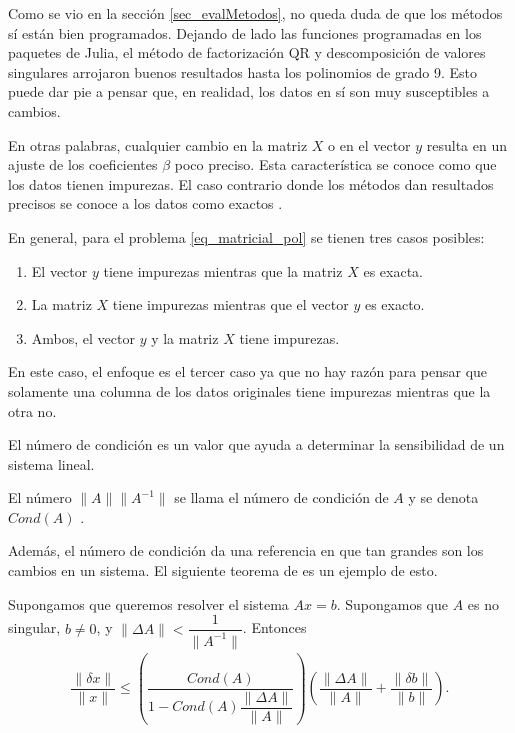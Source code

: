 Como se vio en la sección \ref{sec_evalMetodos}, no queda duda de que los métodos sí están bien programados. Dejando de lado las funciones programadas en los paquetes de \textsf{Julia}, el método de factorización QR y descomposición de valores singulares arrojaron buenos resultados hasta los polinomios de grado 9. Esto puede dar pie a pensar que, en realidad, los datos en sí son muy susceptibles a cambios. 

En otras palabras, cualquier cambio en la matriz $X$ o en el vector $y$ resulta en un ajuste de los coeficientes $\beta$ poco preciso. Esta característica se conoce como que los datos tienen impurezas. El caso contrario donde los métodos dan resultados precisos se conoce a los datos como exactos \cite{numerical_linear_algebra}.


En general, para el problema \ref{eq_matricial_pol} se tienen tres casos posibles: 
\begin{enumerate}
    \item El vector $y$ tiene impurezas mientras que la matriz $X$ es exacta. 
    \item La matriz $X$ tiene impurezas mientras que el vector $y$ es exacto.
    \item Ambos, el vector $y$ y la matriz $X$ tiene impurezas. 
\end{enumerate}

En este caso, el enfoque es el tercer caso ya que no hay razón para pensar que solamente una columna de los datos originales tiene impurezas mientras que la otra no. 

El número de condición es un valor que ayuda a determinar la sensibilidad de un sistema lineal. 

\begin{definition}
	El número $\parallel A \parallel  \parallel A^{-1} \parallel$ se llama el número de condición de $A$ y se denota $Cond(A)$ \cite[p.~62]{numerical_linear_algebra}. 
\end{definition}

Además, el número de condición da una referencia en que tan grandes son los cambios en un sistema. El siguiente teorema de \cite[p.~65]{numerical_linear_algebra} es un ejemplo de esto.


\begin{theorem} \label{teo:perturbaciones}
Supongamos que queremos resolver el sistema $Ax = b$. Supongamos que $A$ es no singular, $b \neq 0$, y $\parallel \Delta A \parallel < \dfrac{1}{\parallel A^{-1} \parallel}$. 
Entonces
\begin{equation*}
    \begin{aligned}
    \dfrac{\parallel \delta x \parallel}{\parallel x \parallel} \leq (\dfrac{Cond(A)}{1 - Cond(A) \dfrac{\parallel \Delta A \parallel}{\parallel A \parallel}}) (\dfrac{\parallel \Delta A \parallel}{\parallel A \parallel} + \dfrac{\parallel \delta b \parallel}{\parallel b \parallel}).
    \end{aligned}
\end{equation*} 
\end{theorem}


